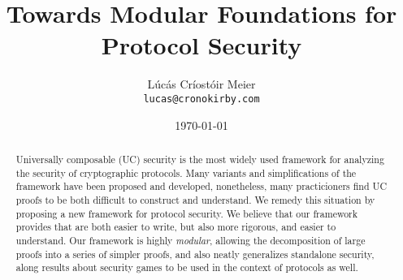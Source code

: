 

\date{\today}
\title{Towards Modular Foundations for\\ Protocol Security}
\author{Lúcás Críostóir Meier\\\texttt{lucas@cronokirby.com}}



\maketitle

\begin{abstract}

Universally composable (UC) security \cite{EPRINT:Canetti00}
is the most widely used framework for analyzing the security of cryptographic
protocols.
Many variants and simplifications of the framework have been proposed and developed,
nonetheless, many practicioners find UC proofs to be both difficult
to construct and understand.
We remedy this situation by proposing a new framework for protocol security.
We believe that our framework provides that are both
easier to write, but also more rigorous, and easier to understand.
Our framework is highly \emph{modular}, allowing the decomposition
of large proofs into a series of simpler proofs,
and also neatly generalizes standalone security,
along results about security games to be used in the context
of protocols as well.
\end{abstract}










{\small }
\clearpage
\appendix


